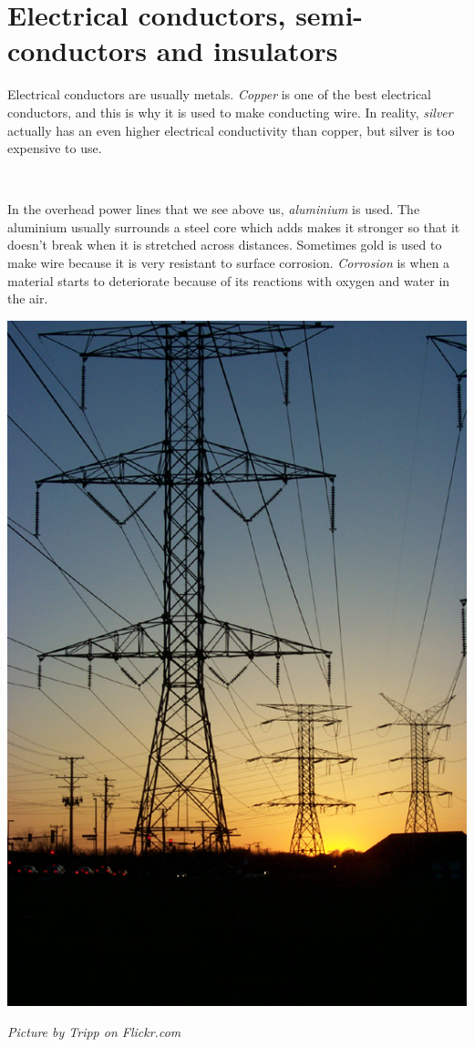             \section{Electrical conductors, semi-conductors and insulators}
            \nopagebreak
\label{m38706*id66058}
 Electrical conductors are usually metals. \textsl{Copper} is one of the best electrical conductors, and this is why it is used to make conducting wire. In reality, \textsl{silver} actually has an even higher electrical conductivity than copper, but silver is too expensive to use. \par \\
\begin{minipage}{0.5\textwidth}
 In the overhead power lines that we see above us, \textsl{aluminium} is used. The aluminium usually surrounds a steel core which adds makes it stronger so that it doesn't break when it is stretched across distances. Sometimes gold is used to make wire because it is very resistant to surface corrosion. \textsl{Corrosion} is when a material starts to deteriorate because of its reactions with oxygen and water in the air.\par 
\end{minipage}
\begin{minipage}{.5\textwidth}
\begin{center}
 \includegraphics[height=.4\textwidth]{photos/Tripp.jpg}\par
\textit{Picture by Tripp on Flickr.com}
\end{center}
\end{minipage}
